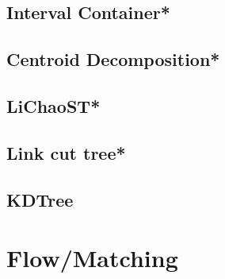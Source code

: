 \subsection{Interval Container*} %

% 
% 
\subsection{Centroid Decomposition*} %

% 
\subsection{LiChaoST*} %

\subsection{Link cut tree*} %

\subsection{KDTree}

% 


\section{Flow/Matching}
